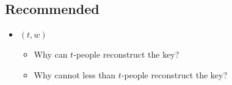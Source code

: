 
\subsection{Recommended}
\begin{itemize}
\item $(t, w)$
  \begin{itemize}
  \item Why can $t$-people reconstruct the key?
  \item Why cannot less than $t$-people reconstruct the key?
  \end{itemize}
\end{itemize}